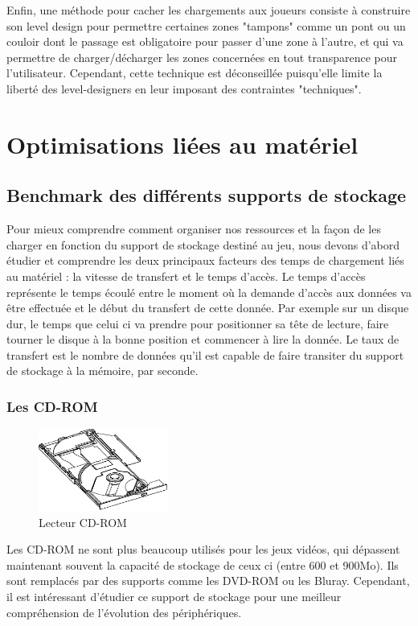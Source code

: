 \documentclass[a4paper, 11pt]{article} %
\begin{document}
Enfin, une méthode pour cacher les chargements aux joueurs consiste à construire son level design pour permettre certaines zones "tampons" comme un pont ou un couloir dont le passage est obligatoire pour passer d'une zone à l'autre, et qui va permettre de charger/décharger les zones concernées en tout transparence pour l'utilisateur. Cependant, cette technique est déconseillée puisqu'elle limite la liberté des level-designers en leur imposant des contraintes "techniques".

\newpage
\section*{Optimisations liées au matériel}
\subsection*{Benchmark des différents supports de stockage}
Pour mieux comprendre comment organiser nos ressources et la façon de les charger en fonction du support de stockage destiné au jeu, nous devons d'abord étudier et comprendre les deux principaux facteurs des temps de chargement liés au matériel : la vitesse de transfert et le temps d'accès. Le temps d'accès représente le temps écoulé entre le moment où la demande d'accès aux données va être effectuée et le début du transfert de cette donnée. Par exemple sur un disque dur, le temps que celui ci va prendre pour positionner sa tête de lecture, faire tourner le disque à la bonne position et commencer à lire la donnée. Le taux de transfert est le nombre de données qu'il est capable de faire transiter du support de stockage à la mémoire, par seconde.

\subsubsection*{Les CD-ROM}
\begin{figure}
\begin{center}
\includegraphics[width=0.38\textwidth]{images/cdrom.png}
\end{center}
\caption{Lecteur CD-ROM}
\end{figure}
Les CD-ROM ne sont plus beaucoup utilisés pour les jeux vidéos, qui dépassent maintenant souvent la capacité de stockage de ceux ci (entre 600 et 900Mo). Ils sont remplacés par des supports comme les DVD-ROM ou les Bluray. Cependant, il est intéressant d'étudier ce support de stockage pour une meilleur compréhension de l'évolution des périphériques.
\end{document}
